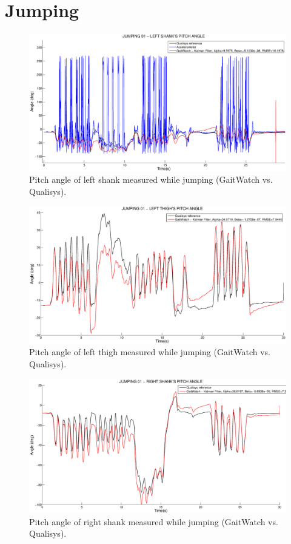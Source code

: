 \section{Jumping}

\begin{figure}[H]
\centering
\includegraphics[width=1\textwidth]{figures/jumping_01_left_shank_with_acc.eps}
\caption{Pitch angle of left shank measured while jumping (GaitWatch vs. Qualisys).}
\label{fig:jumping_left_shank01}
\end{figure}

\begin{figure}[H]
\centering
\includegraphics[width=1\textwidth]{figures/jumping_01_left_thigh.eps}
\caption{Pitch angle of left thigh measured while jumping (GaitWatch vs. Qualisys).}
\label{fig:jumping_left_thigh01}
\end{figure}

\begin{figure}[H]
\centering
\includegraphics[width=1\textwidth]{figures/jumping_01_right_shank.eps}
\caption{Pitch angle of right shank measured while jumping (GaitWatch vs. Qualisys).}
\label{fig:jumping_right_shank01}
\end{figure}


